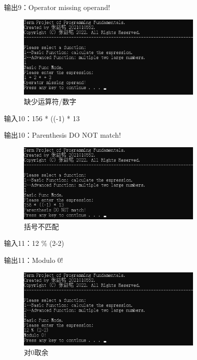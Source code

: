\documentclass[a4paper, 11pt, UTF8]{ctexart}
\begin{document}
输出9：Operator missing operand!

\begin{figure}[H]
    \centering
    \caption{缺少运算符/数字}
    \includegraphics[width=0.8\textwidth]{t10.png}    
\end{figure}

输入10：156 * ((-1) * 13

输出10：Parenthesis DO NOT match!

\begin{figure}[H]
    \centering
    \caption{括号不匹配}
    \includegraphics[width=0.8\textwidth]{t9.png}
\end{figure}

输入11：12 \% (2-2)

输出11：Modulo 0!

\begin{figure}[H]
    \centering
    \caption{对0取余}
    \includegraphics[width=0.8\textwidth]{t11.png}
\end{figure}
\end{document}
